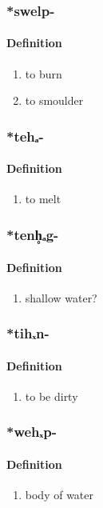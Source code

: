 \subsubsection{\**swelp-}
\paragraph{Definition}
\begin{enumerate}
\item to burn
\item to smoulder
\end{enumerate}
\subsubsection{\**tehₐ-}
\paragraph{Definition}
\begin{enumerate}
\item to melt
\end{enumerate}
\subsubsection{\**tenh̥ₐg-}
\paragraph{Definition}
\begin{enumerate}
\item shallow water?
\end{enumerate}
\subsubsection{\**tihₓn-}
\paragraph{Definition}
\begin{enumerate}
\item to be dirty
\end{enumerate}
\subsubsection{\**wehₓp-}
\paragraph{Definition}
\begin{enumerate}
\item body of water
\end{enumerate}
